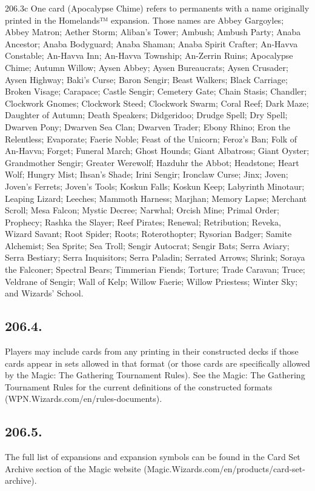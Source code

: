 206.3c One card (Apocalypse Chime) refers to permanents with a name originally printed in the Homelands™ expansion. Those names are Abbey Gargoyles; Abbey Matron; Aether Storm; Aliban’s Tower; Ambush; Ambush Party; Anaba Ancestor; Anaba Bodyguard; Anaba Shaman; Anaba Spirit Crafter; An-Havva Constable; An-Havva Inn; An-Havva Township; An-Zerrin Ruins; Apocalypse Chime; Autumn Willow; Aysen Abbey; Aysen Bureaucrats; Aysen Crusader; Aysen Highway; Baki’s Curse; Baron Sengir; Beast Walkers; Black Carriage; Broken Visage; Carapace; Castle Sengir; Cemetery Gate; Chain Stasis; Chandler; Clockwork Gnomes; Clockwork Steed; Clockwork Swarm; Coral Reef; Dark Maze; Daughter of Autumn; Death Speakers; Didgeridoo; Drudge Spell; Dry Spell; Dwarven Pony; Dwarven Sea Clan; Dwarven Trader; Ebony Rhino; Eron the Relentless; Evaporate; Faerie Noble; Feast of the Unicorn; Feroz’s Ban; Folk of An-Havva; Forget; Funeral March; Ghost Hounds; Giant Albatross; Giant Oyster; Grandmother Sengir; Greater Werewolf; Hazduhr the Abbot; Headstone; Heart Wolf; Hungry Mist; Ihsan’s Shade; Irini Sengir; Ironclaw Curse; Jinx; Joven; Joven’s Ferrets; Joven’s Tools; Koskun Falls; Koskun Keep; Labyrinth Minotaur; Leaping Lizard; Leeches; Mammoth Harness; Marjhan; Memory Lapse; Merchant Scroll; Mesa Falcon; Mystic Decree; Narwhal; Orcish Mine; Primal Order; Prophecy; Rashka the Slayer; Reef Pirates; Renewal; Retribution; Reveka, Wizard Savant; Root Spider; Roots; Roterothopter; Rysorian Badger; Samite Alchemist; Sea Sprite; Sea Troll; Sengir Autocrat; Sengir Bats; Serra Aviary; Serra Bestiary; Serra Inquisitors; Serra Paladin; Serrated Arrows; Shrink; Soraya the Falconer; Spectral Bears; Timmerian Fiends; Torture; Trade Caravan; Truce; Veldrane of Sengir; Wall of Kelp; Willow Faerie; Willow Priestess; Winter Sky; and Wizards’ School.

\subsection*{206.4.}
Players may include cards from any printing in their constructed decks if those cards appear in sets allowed in that format (or those cards are specifically allowed by the Magic: The Gathering Tournament Rules). See the Magic: The Gathering Tournament Rules for the current definitions of the constructed formats (WPN.Wizards.com/en/rules-documents).

\subsection*{206.5.}
The full list of expansions and expansion symbols can be found in the Card Set Archive section of the Magic website (Magic.Wizards.com/en/products/card-set-archive).

